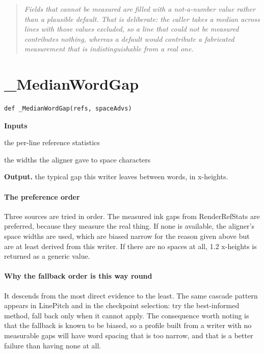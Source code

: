 \begin{quote}\small\itshape Fields that cannot be measured are filled with a not-a-number value rather than a plausible default. That is deliberate: the caller takes a median across lines with those values excluded, so a line that could not be measured contributes nothing, whereas a default would contribute a fabricated measurement that is indistinguishable from a real one.\end{quote}

\section{\_MedianWordGap}
\begin{lstlisting}[style=sig]
def _MedianWordGap(refs, spaceAdvs)
\end{lstlisting}

\noindent\textbf{Inputs}
\begin{description}[leftmargin=2.2em,style=nextline,font=\normalfont\ttfamily]\setlength\itemsep{1pt}
  \item[{refs}] \normalfont the per-line reference statistics
  \item[{spaceAdvs}] \normalfont the widths the aligner gave to space characters
\end{description}

\noindent\textbf{Output.} the typical gap this writer leaves between words, in x-heights.


\paragraph{The preference order}
Three sources are tried in order. The measured ink gaps from RenderRefStats are preferred, because they measure the real thing. If none is available, the aligner's space widths are used, which are biased narrow for the reason given above but are at least derived from this writer. If there are no spaces at all, 1.2 x-heights is returned as a generic value.


\paragraph{Why the fallback order is this way round}
It descends from the most direct evidence to the least. The same cascade pattern appears in LinePitch and in the checkpoint selection: try the best-informed method, fall back only when it cannot apply. The consequence worth noting is that the fallback is known to be biased, so a profile built from a writer with no measurable gaps will have word spacing that is too narrow, and that is a better failure than having none at all.


